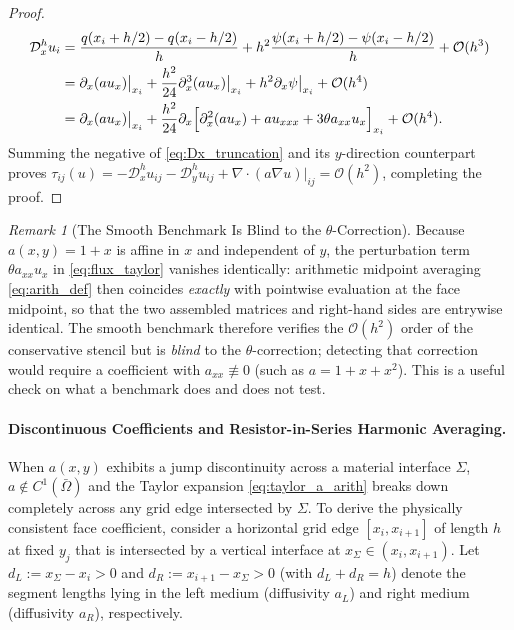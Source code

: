\documentclass[11pt,a4paper]{article}
\theoremstyle{definition}
\theoremstyle{remark}
\newtheorem{remark}[theorem]{Remark}
\begin{document}
\begin{proof}
	\begin{align}
		\mathcal{D}_x^h u_i &= \frac{q(x_i + h/2) - q(x_i - h/2)}{h} + h^2 \frac{\psi(x_i + h/2) - \psi(x_i - h/2)}{h} + \mathcal{O}(h^3) \nonumber \\
		&= \partial_x(au_x)\big|_{x_i} + \frac{h^2}{24}\partial_x^3(au_x)\big|_{x_i} + h^2 \partial_x \psi\big|_{x_i} + \mathcal{O}(h^4) \nonumber \\
		&= \partial_x(au_x)\big|_{x_i} + \frac{h^2}{24}\partial_x\Bigl[ \partial_x^2(au_x) + a u_{xxx} + 3\theta a_{xx}u_x \Bigr]_{x_i} + \mathcal{O}(h^4).
		\label{eq:Dx_truncation}
	\end{align}
	Summing the negative of \eqref{eq:Dx_truncation} and its $y$-direction counterpart proves $\tau_{ij}(u) = -\mathcal{D}_x^h u_{ij} - \mathcal{D}_y^h u_{ij} + \nabla\cdot(a\nabla u)|_{ij} = \mathcal{O}(h^2)$, completing the proof.
\end{proof}

\begin{remark}[The Smooth Benchmark Is Blind to the $\theta$-Correction]
\label{rem:theta_blind}
Because $a(x,y)=1+x$ is affine in $x$ and independent of $y$, the perturbation term $\theta a_{xx}u_x$ in \eqref{eq:flux_taylor} vanishes identically: arithmetic midpoint averaging \eqref{eq:arith_def} then coincides \emph{exactly} with pointwise evaluation at the face midpoint, so that the two assembled matrices and right-hand sides are entrywise identical. The smooth benchmark therefore verifies the $\mathcal{O}(h^2)$ order of the conservative stencil but is \emph{blind} to the $\theta$-correction; detecting that correction would require a coefficient with $a_{xx}\not\equiv0$ (such as $a=1+x+x^2$). This is a useful check on what a benchmark does and does not test.
\end{remark}

\paragraph{Discontinuous Coefficients and Resistor-in-Series Harmonic Averaging.}
When $a(x,y)$ exhibits a jump discontinuity across a material interface $\Sigma$, $a \notin C^1(\bar{\Omega})$ and the Taylor expansion \eqref{eq:taylor_a_arith} breaks down completely across any grid edge intersected by $\Sigma$. To derive the physically consistent face coefficient, consider a horizontal grid edge $[x_i, x_{i+1}]$ of length $h$ at fixed $y_j$ that is intersected by a vertical interface at $x_\Sigma \in (x_i, x_{i+1})$. Let $d_L := x_\Sigma - x_i > 0$ and $d_R := x_{i+1} - x_\Sigma > 0$ (with $d_L + d_R = h$) denote the segment lengths lying in the left medium (diffusivity $a_L$) and right medium (diffusivity $a_R$), respectively.
\end{document}
